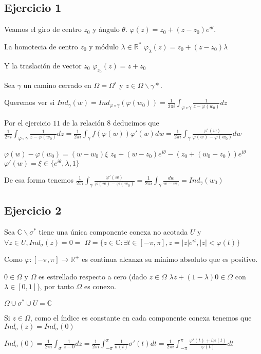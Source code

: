 \subsection{Ejercicio 1}
Veamos el giro de centro $z_0$ y ángulo $\theta$.
$\varphi(z) = z_0 + (z-z_0)e^{i\theta}$.

La homotecia de centro $z_0$ y módulo $\lambda\in\mathbb{R}^{\ast}$
$\varphi_{\lambda}(z) = z_0 + (z-z_0)\lambda$

Y la traslación de vector $z_0$
$\varphi_{z_0} (z) = z+z_0$

Sea $\gamma$ un camino cerrado en $\Omega=\Omega^{\circ}$
y $z\in\Omega\backslash\gamma{\ast}$.

Queremos ver si  $Ind_{\gamma}(w)=Ind_{\varphi\circ\gamma} (\varphi(w_0)) = \frac{1}{2\pi i} \int_{\varphi\circ\gamma} \frac{1}{z-\varphi(w_0)} dz$
 
Por el ejercicio $11$ de la relación $8$ deducimos que
$\frac{1}{2\pi i} \int_{\varphi\circ\gamma} \frac{1}{z-\varphi(w_0)} dz = \frac{1}{2\pi i} \int_{\gamma} f(\varphi(w))\varphi'(w) dw = \frac{1}{2\pi i} \int_{\gamma} \frac{\varphi'(w)}{\varphi(w)-\varphi(w_0)} dw$

$\varphi(w)-\varphi(w_0) = (w-w_0) \xi$
$z_0+(w-z_0)e^{i\theta}-(z_0+(w_0-z_0))e^{i\theta}$
$\varphi'(w) = \xi \in \{ e^{i\theta},\lambda,1 \}$

De esa forma tenemos 
$\frac{1}{2\pi i} \int_{\gamma} \frac{\varphi'(w)}{\varphi(w)-\varphi(w_0)} = \frac{1}{2\pi i} \int_{\gamma} \frac{dw}{w-w_0} = Ind_{\gamma}(w_0)$


\subsection{Ejercicio 2}
Sea $\mathbb{C}\backslash\sigma^{\ast}$ tiene una única componente conexa no acotada $U$ y $\forall z\in U, Ind_{\sigma}(z)=0=$
$\Omega = \{ z\in\mathbb{C} : \exists t\in[-\pi,\pi], z=|z|e^{it}, |z|<\varphi(t) \}$

Como $\varphi : [-\pi,\pi] \rightarrow \mathbb{R}^+$ es continua alcanza su mínimo absoluto que es positivo.

$0\in\Omega$ y $\Omega$ es estrellado respecto a cero
(dado $z\in\Omega$ $\lambda z + (1-\lambda)0 \in\Omega$ con $\lambda\in[0,1]$), por tanto $\Omega$ es conexo.

$\Omega \cup \sigma^{\ast} \cup U = \mathbb{C}$

Si $z\in\Omega$, como el índice es constante en cada componente conexa tenemos que $Ind_{\sigma}(z) = Ind_{\sigma}(0)$

$Ind_{\sigma}(0) = \frac{1}{2\pi i} \int_{\sigma} \frac{1}{z-0}dz = \frac{1}{2\pi i} \int_{-\pi}^{\pi} \frac{1}{\sigma(t)} \sigma'(t)dt = \frac{1}{2\pi i} \int_{-\pi}^{\pi} \frac{\varphi'(t)+i\varphi(t)}{\varphi(t)} dt$


